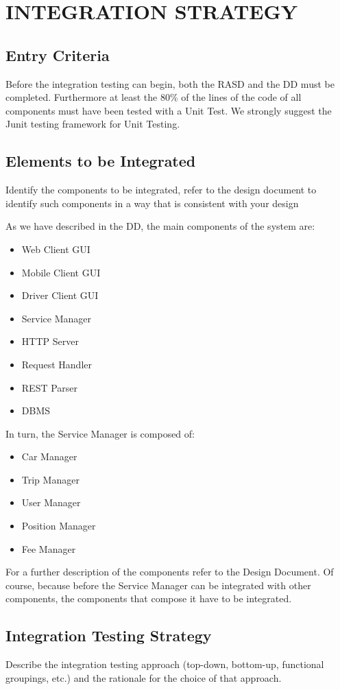 \section{INTEGRATION STRATEGY}
\subsection{Entry Criteria} 
Before the integration testing can begin, both the RASD and the DD must be completed. Furthermore at least the 80\% of the lines of the code of all components must have been tested with a Unit Test. We strongly suggest the Junit testing framework for Unit Testing.
\subsection{Elements to be Integrated} Identify the components to be integrated, refer to the design document to identify such components in a way that is consistent with your design
\newline 

As we have described in the DD, the main components of the system are:
\begin{itemize}
\item Web Client GUI
\item Mobile Client GUI
\item Driver Client GUI
\item Service Manager 
\item HTTP Server
\item Request Handler
\item REST Parser
\item DBMS
\end{itemize}

In turn, the Service Manager is composed of:
\begin{itemize}
\item Car Manager
\item Trip Manager
\item User Manager
\item Position Manager
\item Fee Manager
\end{itemize}
\noindent
For a further description of the components refer to the Design Document. 
\newline 
Of course, because before the Service Manager can be integrated with other components, the components that compose it have to be integrated.


\subsection{Integration Testing Strategy} Describe the integration testing approach (top-down, bottom-up, functional groupings, etc.) and the rationale for the choice of that approach.
